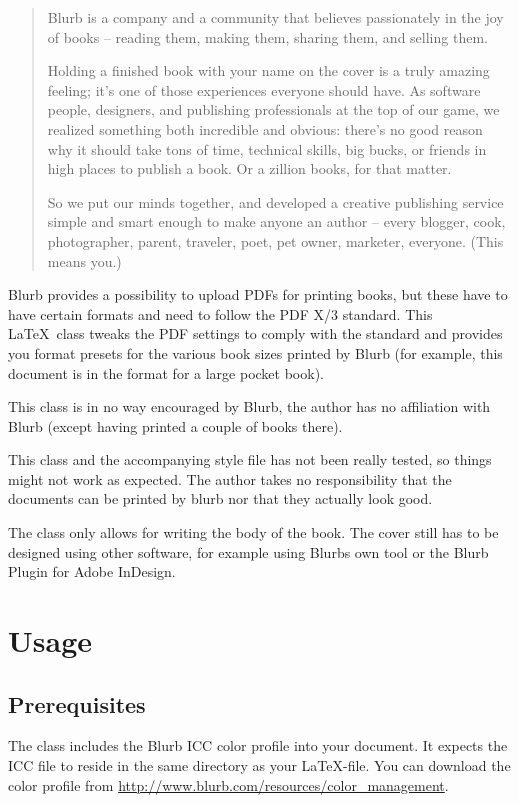 \documentclass[english,10pt,bbook=pocketbig,inner=1cm,outer=2.5cm]{npblurb}
\begin{document}
\begin{quotation}
Blurb is a company and a community that believes passionately in the joy of books – reading them, making them, sharing them, and selling them.

Holding a finished book with your name on the cover is a truly amazing feeling; it’s one of those experiences everyone should have. As software people, designers, and publishing professionals at the top of our game, we realized something both incredible and obvious: there’s no good reason why it should take tons of time, technical skills, big bucks, or friends in high places to publish a book. Or a zillion books, for that matter.

So we put our minds together, and developed a creative publishing service simple and smart enough to make anyone an author – every blogger, cook, photographer, parent, traveler, poet, pet owner, marketer, everyone. (This means you.)
\end{quotation}

Blurb provides a possibility to upload PDFs for printing books, but these have to have certain formats and need to follow the PDF X/3 standard. This \LaTeX\ class tweaks the PDF settings to comply with the standard and provides you format presets for the various book sizes printed by Blurb (for example, this document is in the format for a large pocket book).

This class is in no way encouraged by Blurb, the author has no affiliation with Blurb (except having printed a couple of books there).

\begin{alertbox}
This class and the accompanying style file has not been really tested, so things might not work as expected. The author takes no responsibility that the documents can be printed by blurb nor that they actually look good.
\end{alertbox}

The class only allows for writing the body of the book. The cover still has to be designed using other software, for example using Blurbs own tool or the Blurb Plugin for Adobe InDesign.

\chapter{Usage}
\section{Prerequisites}
The class includes the Blurb ICC color profile into your document. It expects the ICC file to reside in the same directory as your \LaTeX-file. You can download the color profile from \url{http://www.blurb.com/resources/color_management}.
\end{document}
